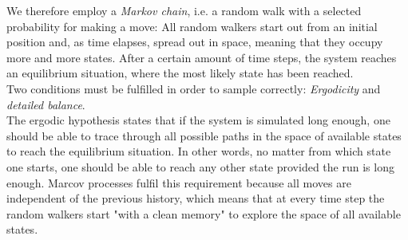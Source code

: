 We therefore employ a \textit{Markov chain}, i.e. a random walk with a selected probability for making a move: All random walkers start out from an initial position and, as time elapses, spread out in space, meaning that they occupy more and more states. After a certain amount of time steps, the system reaches an equilibrium situation, where the most likely state has been reached.\\
Two conditions must be fulfilled in order to sample correctly: \textit{Ergodicity} and \textit{detailed balance}.\\
The ergodic hypothesis states that if the system is simulated long enough, one should be able to trace through all possible paths in the space of available states to reach the equilibrium situation. In other words, no matter from which state one starts, one should be able to reach any other state provided the run is long enough. Marcov processes fulfil this requirement because all moves are independent of the previous history, which means that at every time step the random walkers start "with a clean memory" to explore the space of all available states.

